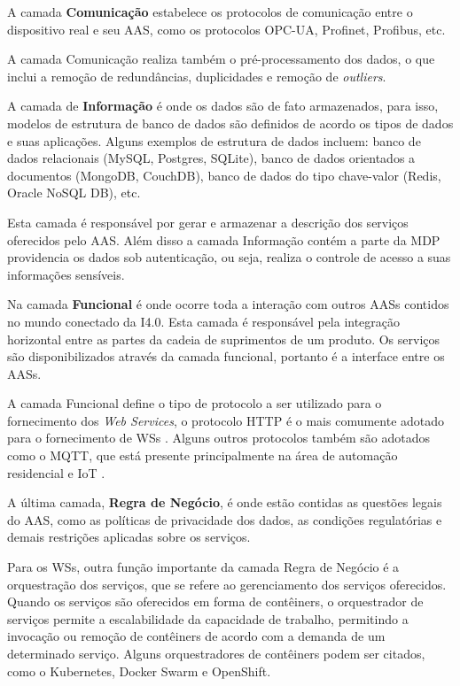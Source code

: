 	A camada \textbf{Comunicação} estabelece os protocolos de comunicação entre o dispositivo real e seu AAS, como os protocolos OPC-UA, Profinet, Profibus, etc.
	
	A camada Comunicação realiza também o pré-processamento dos dados, o que inclui a remoção de redundâncias, duplicidades e remoção de \textit{outliers}.
	
	A camada de \textbf{Informação} é onde os dados são de fato armazenados, para isso, modelos de estrutura de banco de dados são definidos de acordo os tipos de dados e suas aplicações. Alguns exemplos de estrutura de dados incluem: banco de dados relacionais (MySQL, Postgres, SQLite), banco de dados orientados a documentos (MongoDB, CouchDB), banco de dados do tipo chave-valor (Redis, Oracle NoSQL DB), etc.
	
	Esta camada é responsável por gerar e armazenar a descrição dos serviços oferecidos pelo AAS. Além disso a camada Informação contém a parte da MDP providencia os dados sob autenticação, ou seja, realiza o controle de acesso a suas informações sensíveis.
	
	Na camada \textbf{Funcional} é onde ocorre toda a interação com outros AASs contidos no mundo conectado da I4.0. Esta camada é responsável pela integração horizontal entre as partes da cadeia de suprimentos de um produto. Os serviços são disponibilizados através da camada funcional, portanto é a interface entre os AASs. 
	
	A camada Funcional define o tipo de protocolo a ser utilizado para o fornecimento dos \textit{Web Services}, o protocolo HTTP é o mais comumente adotado para o fornecimento de WSs \cite{gruner2016restful}. Alguns outros protocolos também são adotados como o MQTT, que está presente principalmente na área de automação residencial e IoT \cite{yokotani2016mqtt}.
	
	A última camada, \textbf{Regra de Negócio}, é onde estão contidas as questões legais do AAS, como as políticas de privacidade dos dados, as condições regulatórias e demais restrições aplicadas sobre os serviços.
	
	Para os WSs, outra função importante da camada Regra de Negócio é a orquestração dos serviços, que se refere ao gerenciamento dos serviços oferecidos. Quando os serviços são oferecidos em forma de contêiners, o orquestrador de serviços permite a escalabilidade da capacidade de trabalho, permitindo a invocação ou remoção de contêiners de acordo com a demanda de um determinado serviço. Alguns orquestradores de contêiners podem ser citados, como o Kubernetes, Docker Swarm e OpenShift.
	
